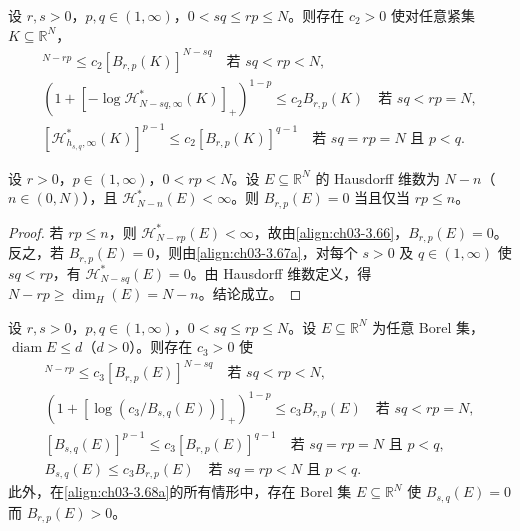 \documentclass[../../main.tex]{subfiles}%
\begin{document}
\begin{proposition}\label{proposition:ch03-BesselHausdorff下界}
设 $r,s>0$，$p,q\in(1,\infty)$，$0<sq\leqslant rp\leqslant N$。则存在 $c_2>0$ 使对任意紧集 $K\subseteq\mathbb{R}^N$，
\begin{align}
[\mathcal{H}^*_{N-sq,\infty}(K)]^{N-rp}\leqslant c_2[B_{r,p}(K)]^{N-sq}
\quad \text{若 }sq<rp<N,\label{align:ch03-3.67a}\\
(1+[-\log\mathcal{H}^*_{N-sq,\infty}(K)]_+)^{1-p}\leqslant c_2 B_{r,p}(K)
\quad \text{若 }sq<rp=N,\label{align:ch03-3.67b}\\
[\mathcal{H}^*_{h_{s,q},\infty}(K)]^{p-1}\leqslant c_2[B_{r,p}(K)]^{q-1}
\quad \text{若 }sq=rp=N\text{ 且 }p<q.\label{align:ch03-3.67c}
\end{align}
\end{proposition}

\begin{corollary}\label{corollary:ch03-Hausdorff维数}\label{theorem:ch03-Hausdorff}
设 $r>0$，$p\in(1,\infty)$，$0<rp<N$。设 $E\subseteq\mathbb{R}^N$ 的 Hausdorff 维数为 $N-n$（$n\in(0,N)$），且 $\mathcal{H}^*_{N-n}(E)<\infty$。则 $B_{r,p}(E)=0$ 当且仅当 $rp\leqslant n$。
\end{corollary}

\begin{proof}
若 $rp\leqslant n$，则 $\mathcal{H}^*_{N-rp}(E)<\infty$，故由\eqref{align:ch03-3.66}，$B_{r,p}(E)=0$。反之，若 $B_{r,p}(E)=0$，则由\eqref{align:ch03-3.67a}，对每个 $s>0$ 及 $q\in(1,\infty)$ 使 $sq<rp$，有 $\mathcal{H}^*_{N-sq}(E)=0$。由 Hausdorff 维数定义，得 $N-rp\geqslant\dim_H(E)=N-n$。结论成立。
\end{proof}

\begin{theorem}\label{theorem:ch03-容量比较}
\label{theorem:ch03-容量单调}
设 $r,s>0$，$p,q\in(1,\infty)$，$0<sq\leqslant rp\leqslant N$。设 $E\subseteq\mathbb{R}^N$ 为任意 Borel 集，$\operatorname{diam}E\leqslant d$（$d>0$）。则存在 $c_3>0$ 使
\begin{align}
[B_{s,q}(E)]^{N-rp}\leqslant c_3[B_{r,p}(E)]^{N-sq}
\quad \text{若 }sq<rp<N,\label{align:ch03-3.68a}\\
(1+[\log(c_3/B_{s,q}(E))]_+)^{1-p}\leqslant c_3 B_{r,p}(E)
\quad \text{若 }sq<rp=N,\label{align:ch03-3.68b}\\
[B_{s,q}(E)]^{p-1}\leqslant c_3[B_{r,p}(E)]^{q-1}
\quad \text{若 }sq=rp=N\text{ 且 }p<q,\label{align:ch03-3.68c}\\
B_{s,q}(E)\leqslant c_3 B_{r,p}(E)
\quad \text{若 }sq=rp<N\text{ 且 }p<q.\label{align:ch03-3.68d}
\end{align}
此外，在\eqref{align:ch03-3.68a}的所有情形中，存在 Borel 集 $E\subseteq\mathbb{R}^N$ 使 $B_{s,q}(E)=0$ 而 $B_{r,p}(E)>0$。
\end{theorem}
\end{document}
